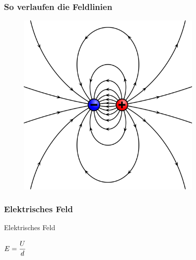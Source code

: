 \begin{frame}
  \frametitle{So verlaufen die Feldlinien}
  \begin{center}
    \begin{figure}
      \includegraphics[width=0.8\textwidth,height=.75\textheight,keepaspectratio]{a08/VFPt_dipole_electric_mit.png}
    \end{figure}
  \end{center}
\end{frame}

\begin{frame}
  \frametitle{Elektrisches Feld}
  \begin{block}{Elektrisches Feld}
    \begin{center}
      \huge $E = \cfrac{U}{d}$
    \end{center}
  \end{block}
\end{frame}

